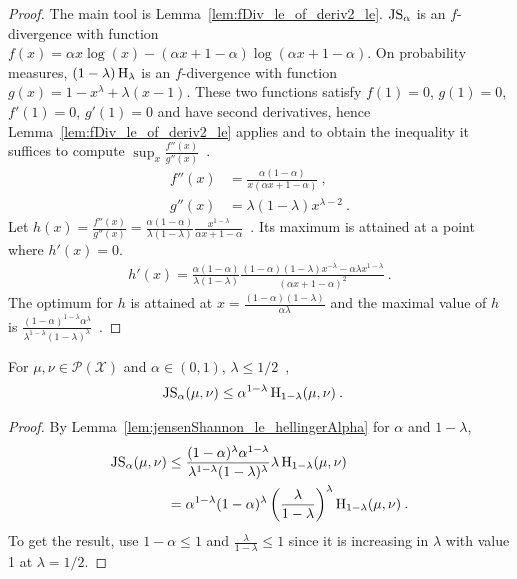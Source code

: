 \begin{proof}%
{}
The main tool is Lemma~\ref{lem:fDiv_le_of_deriv2_le}.
$\operatorname{JS}_\alpha$ is an $f$-divergence with function $f(x) = \alpha x \log(x) - (\alpha x + 1 - \alpha) \log (\alpha x + 1 - \alpha)$. On probability measures, $(1 - \lambda)\operatorname{H}_\lambda$ is an $f$-divergence with function $g(x) = 1 - x^\lambda + \lambda(x-1)$.
These two functions satisfy $f(1) = 0$, $g(1) = 0$, $f'(1) = 0$, $g'(1) = 0$ and have second derivatives, hence Lemma~\ref{lem:fDiv_le_of_deriv2_le} applies and to obtain the inequality it suffices to compute $\sup_x\frac{f''(x)}{g''(x)}$~.
\begin{align*}
f''(x)
&= \frac{\alpha(1 - \alpha)}{x(\alpha x + 1 - \alpha)}
\: , \\
g''(x)
&= \lambda (1 - \lambda) x^{\lambda - 2}
\: .
\end{align*}
Let $h(x) = \frac{f''(x)}{g''(x)} = \frac{\alpha (1 - \alpha)}{\lambda (1 - \lambda)} \frac{x^{1 - \lambda}}{\alpha x + 1 - \alpha}$~. Its maximum is attained at a point where $h'(x) = 0$.
\begin{align*}
h'(x) = \frac{\alpha (1 - \alpha)}{\lambda (1 - \lambda)} \frac{(1 - \alpha)(1 - \lambda)x^{-\lambda} - \alpha \lambda x^{1 - \lambda}}{(\alpha x + 1 - \alpha)^2}
\: .
\end{align*}
The optimum for $h$ is attained at $x = \frac{(1 - \alpha)(1 - \lambda)}{\alpha \lambda}$ and the maximal value of $h$ is $\frac{(1 - \alpha)^{1 - \lambda} \alpha^\lambda}{\lambda^{1 - \lambda} (1 - \lambda)^\lambda}$~.
\end{proof}


\begin{corollary}
  \label{cor:jensenShannon_le_hellingerAlpha_of_le_half}
  For $\mu, \nu \in \mathcal P(\mathcal X)$ and $\alpha \in (0,1)$, $\lambda \le 1/2$~,
  \begin{align*}
  \operatorname{JS}_\alpha(\mu, \nu)
  &\le \alpha^{1 - \lambda} \operatorname{H}_{1 - \lambda}(\mu, \nu)
  \: .
  \end{align*}
\end{corollary}

\begin{proof}%
{}
By Lemma~\ref{lem:jensenShannon_le_hellingerAlpha} for $\alpha$ and $1 - \lambda$,
\begin{align*}
\operatorname{JS}_\alpha(\mu, \nu)
&\le \frac{(1 - \alpha)^{\lambda} \alpha^{1 - \lambda}}{\lambda^{1 - \lambda} (1 - \lambda)^\lambda} \lambda \operatorname{H}_{1 - \lambda}(\mu, \nu)
\\
&= \alpha^{1 - \lambda} (1 - \alpha)^\lambda \left(\frac{\lambda}{1 - \lambda}\right)^\lambda \operatorname{H}_{1 - \lambda}(\mu, \nu)
\: .
\end{align*}
To get the result, use $1 - \alpha \le 1$ and $\frac{\lambda}{1 - \lambda} \le 1$ since it is increasing in $\lambda$ with value 1 at $\lambda = 1/2$.

\end{proof}